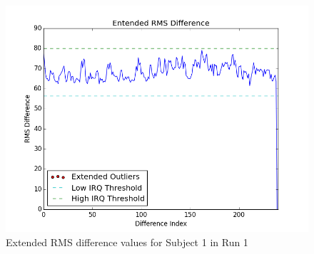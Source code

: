 \begin{figure}[h!]
\centering
\includegraphics[width=120mm]{images/extended_vol_rms_outliers.png}
\caption{Extended RMS difference values for Subject 1 in Run 1}
\label{fig:erms}
\end{figure}
